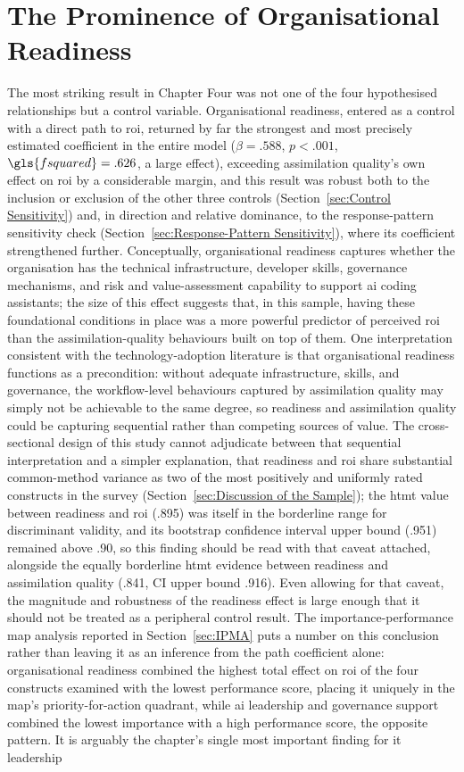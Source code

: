 \section{The Prominence of Organisational Readiness}
\label{sec:Discussion Readiness}
The most striking result in Chapter Four was not one of the four hypothesised relationships but a control variable. Organisational readiness, entered as a control with a direct path to \gls{roi}, returned by far the strongest and most precisely estimated coefficient in the entire model ($\beta = .588$, $p < .001$, $\gls{fsquared}  = .626$, a large effect), exceeding assimilation quality's own effect on \gls{roi} by a considerable margin, and this result was robust both to the inclusion or exclusion of the other three controls (Section~\ref{sec:Control Sensitivity}) and, in direction and relative dominance, to the response-pattern sensitivity check (Section~\ref{sec:Response-Pattern Sensitivity}), where its coefficient strengthened further. Conceptually, organisational readiness captures whether the organisation has the technical infrastructure, developer skills, governance mechanisms, and risk and value-assessment capability to support \gls{ai} coding assistants; the size of this effect suggests that, in this sample, having these foundational conditions in place was a more powerful predictor of perceived \gls{roi} than the assimilation-quality behaviours built on top of them. One interpretation consistent with the technology-adoption literature is that organisational readiness functions as a precondition: without adequate infrastructure, skills, and governance, the workflow-level behaviours captured by assimilation quality may simply not be achievable to the same degree, so readiness and assimilation quality could be capturing sequential rather than competing sources of value. The cross-sectional design of this study cannot adjudicate between that sequential interpretation and a simpler explanation, that readiness and \gls{roi} share substantial common-method variance as two of the most positively and uniformly rated constructs in the survey (Section~\ref{sec:Discussion of the Sample}); the \gls{htmt} value between readiness and \gls{roi} (.895) was itself in the borderline range for discriminant validity, and its bootstrap confidence interval upper bound (.951) remained above .90, so this finding should be read with that caveat attached, alongside the equally borderline \gls{htmt} evidence between readiness and assimilation quality (.841, CI upper bound .916). Even allowing for that caveat, the magnitude and robustness of the readiness effect is large enough that it should not be treated as a peripheral control result. The importance-performance map analysis reported in Section~\ref{sec:IPMA} puts a number on this conclusion rather than leaving it as an inference from the path coefficient alone: organisational readiness combined the highest total effect on \gls{roi} of the four constructs examined with the lowest performance score, placing it uniquely in the map's priority-for-action quadrant, while \gls{ai} leadership and governance support combined the lowest importance with a high performance score, the opposite pattern. It is arguably the chapter's single most important finding for \gls{it} leadership 